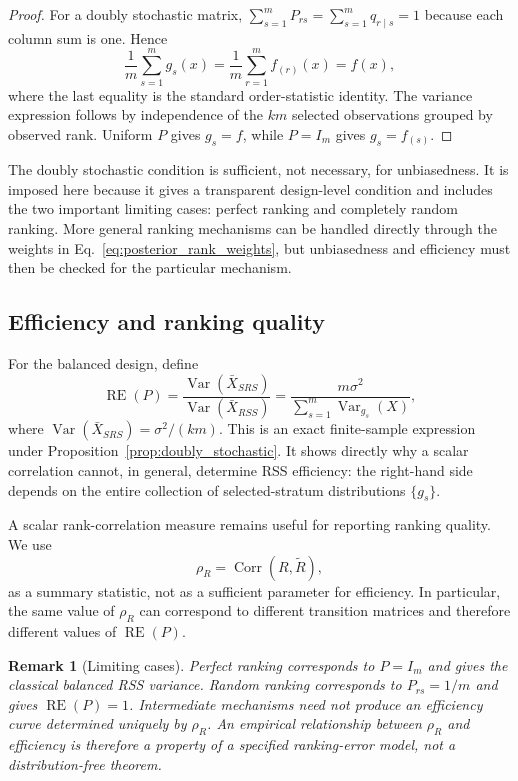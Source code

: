 \documentclass[12pt]{article}
\newtheorem{remark}{Remark}[section]
\begin{document}
\begin{proof}
For a doubly stochastic matrix, $\sum_{s=1}^m P_{rs}=\sum_{s=1}^m q_{r\mid s}=1$ because each column sum is one. Hence
\[
\frac{1}{m}\sum_{s=1}^m g_s(x)
=\frac{1}{m}\sum_{r=1}^m f_{(r)}(x)
=f(x),
\]
where the last equality is the standard order-statistic identity. The variance expression follows by independence of the $km$ selected observations grouped by observed rank. Uniform $P$ gives $g_s=f$, while $P=I_m$ gives $g_s=f_{(s)}$.
\end{proof}

The doubly stochastic condition is sufficient, not necessary, for unbiasedness. It is imposed here because it gives a transparent design-level condition and includes the two important limiting cases: perfect ranking and completely random ranking. More general ranking mechanisms can be handled directly through the weights in Eq.~\eqref{eq:posterior_rank_weights}, but unbiasedness and efficiency must then be checked for the particular mechanism.

\subsection{Efficiency and ranking quality}
For the balanced design, define
\begin{equation}
\label{eq:re_transition}
\operatorname{RE}(P)
=\frac{\operatorname{Var}(\bar X_{SRS})}
{\operatorname{Var}(\bar X_{RSS})}
=\frac{m\sigma^2}{\sum_{s=1}^m \operatorname{Var}_{g_s}(X)},
\end{equation}
where $\operatorname{Var}(\bar X_{SRS})=\sigma^2/(km)$. This is an exact finite-sample expression under Proposition~\ref{prop:doubly_stochastic}. It shows directly why a scalar correlation cannot, in general, determine RSS efficiency: the right-hand side depends on the entire collection of selected-stratum distributions $\{g_s\}$.

A scalar rank-correlation measure remains useful for reporting ranking quality. We use
\begin{equation}
\label{eq:spearman_summary}
\rho_R=\operatorname{Corr}(R,\widetilde R),
\end{equation}
as a summary statistic, not as a sufficient parameter for efficiency. In particular, the same value of $\rho_R$ can correspond to different transition matrices and therefore different values of $\operatorname{RE}(P)$.

\begin{remark}[Limiting cases]
\label{rem:ranking_limits}
Perfect ranking corresponds to $P=I_m$ and gives the classical balanced RSS variance. Random ranking corresponds to $P_{rs}=1/m$ and gives $\operatorname{RE}(P)=1$. Intermediate mechanisms need not produce an efficiency curve determined uniquely by $\rho_R$. An empirical relationship between $\rho_R$ and efficiency is therefore a property of a specified ranking-error model, not a distribution-free theorem.
\end{remark}
\end{document}
